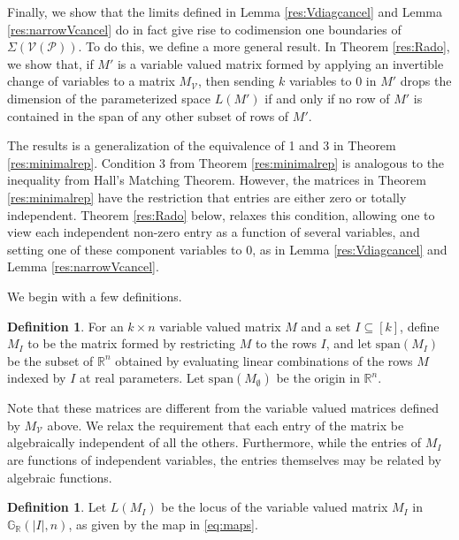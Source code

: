\documentclass[11pt]{article}
\newcommand{\R}{\mathbb{R}}
\newcommand{\Grall}{\mathbb{G}_{\R}}
\newcommand{\cP}{\mathcal{P}}
\newcommand{\cV}{\mathcal{V}}
\newcommand{\VP}{\cV(\cP)}
\theoremstyle{remark}
\theoremstyle{definition}
\newtheorem{dfn}[thm]{Definition}
\begin{document}
\begin{appendices}

Finally, we show that the limits defined in Lemma \ref{res:Vdiagcancel} and Lemma \ref{res:narrowVcancel} do in fact give rise to codimension one boundaries of $\Sigma(\VP)$. To do this, we define a more general result. In Theorem \ref{res:Rado}, we show that, if $M'$ is a variable valued matrix formed by applying an invertible change of variables to a matrix $M_\cV$, then sending $k$ variables to $0$ in $M'$ drops the dimension of the parameterized space $L(M')$ if and only if no row of $M'$ is contained in the span of any other subset of rows of $M'$.

The results is a generalization of the equivalence of 1 and 3 in Theorem \ref{res:minimalrep}. Condition 3 from Theorem \ref{res:minimalrep} is analogous to the inequality from Hall's Matching Theorem. However, 
the matrices in Theorem \ref{res:minimalrep} have the restriction that entries are either zero or totally independent. Theorem \ref{res:Rado} below, relaxes this condition, allowing one to view each independent non-zero entry as a function of several variables, and setting one of these component variables to $0$, as in Lemma \ref{res:Vdiagcancel} and Lemma \ref{res:narrowVcancel}. 

We begin with a few definitions. 

\begin{dfn}
For an $k \times n$ variable valued matrix $M$ and a set $I \subseteq [k]$, define $M_I$ to be the matrix formed by restricting $M$ to the rows $I$, and let $\mathrm{span}(M_I)$ be the subset of $\mathbb{R}^n$ obtained by evaluating linear combinations of the rows $M$ indexed by $I$ at real parameters. Let $\mathrm{span}(M_{\emptyset})$ be the origin in $\mathbb{R}^n$.
\end{dfn}

Note that these matrices are different from the variable valued matrices defined by $M_{\cV}$ above. We relax the requirement that each entry of the matrix be algebraically independent of all the others. Furthermore, while the entries of $M_I$ are functions of independent variables, the entries themselves may be related by algebraic functions.

\begin{dfn}
Let $L(M_I)$ be the locus of the variable valued matrix $M_I$ in $\Grall(|I|, n)$, as given by the map in \eqref{eq:maps}.
\end{dfn}


\end{appendices}
\end{document}
